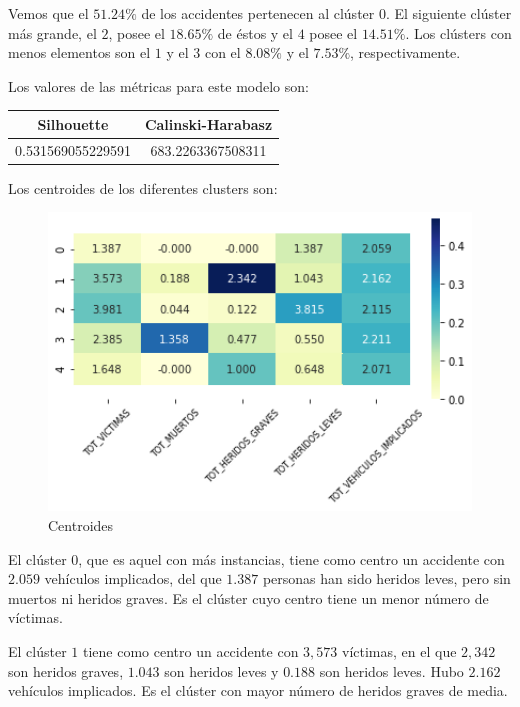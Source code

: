 \documentclass[a4]{article}
\begin{document}
Vemos que el $51.24\%$ de los accidentes pertenecen al clúster $0$. El siguiente clúster más grande, el $2$, posee el $18.65\%$ de éstos y el $4$ posee el $14.51\%$. Los clústers con menos elementos son el $1$ y el $3$ con el $8.08\%$ y el $7.53\%$, respectivamente.

Los valores de las métricas para este modelo son:

\begin{center}
\begin{tabular}{|c|c|}
\hline
\multicolumn{1}{|c|}{\textbf{Silhouette}} & \textbf{Calinski-Harabasz}\\ \hline
 0.531569055229591   & 683.2263367508311  \\ \hline
\end{tabular}
\end{center}

Los centroides de los diferentes clusters son:

\begin{figure}[H]
  \centering
  \caption{Centroides}
  \includegraphics[width=130mm]{imagenes/c1_kmeans_centroides}
\end{figure}

El clúster $0$, que es aquel con más instancias, tiene como centro un accidente con $2.059$ vehículos implicados, del que $1.387$ personas han sido heridos leves, pero sin muertos ni heridos graves. Es el clúster cuyo centro tiene un menor número de víctimas.

El clúster $1$ tiene como centro un accidente con $3,573$ víctimas, en el que $2,342$ son heridos graves, $1.043$ son heridos leves y $0.188$ son heridos leves. Hubo $2.162$ vehículos implicados. Es el clúster con mayor número de heridos graves de media.
\end{document}
